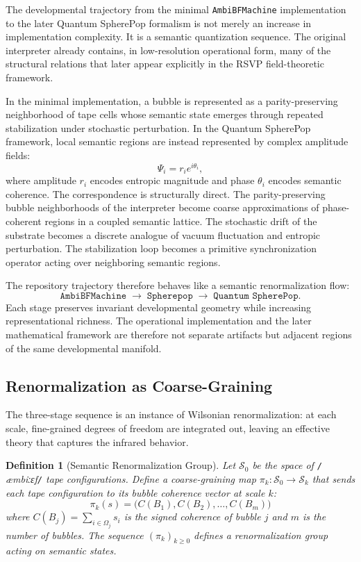 \documentclass[11pt]{article}
\newcommand{\ambibf}{%
  \texttt{/}\textnormal{æmbiːɛf}\texttt{/}%
}
\newtheorem{definition}[theorem]{Definition}
\begin{document}
The developmental trajectory from the minimal \texttt{AmbiBFMachine}
implementation to the later Quantum SpherePop formalism is not merely an
increase in implementation complexity. It is a semantic quantization sequence.
The original interpreter already contains, in low-resolution operational form,
many of the structural relations that later appear explicitly in the RSVP
field-theoretic framework.

In the minimal implementation, a bubble is represented as a parity-preserving
neighborhood of tape cells whose semantic state emerges through repeated
stabilization under stochastic perturbation. In the Quantum SpherePop
framework, local semantic regions are instead represented by complex amplitude
fields:
\[
\Psi_i = r_i e^{i\theta_i},
\]
where amplitude $r_i$ encodes entropic magnitude and phase $\theta_i$ encodes
semantic coherence. The correspondence is structurally direct. The
parity-preserving bubble neighborhoods of the interpreter become coarse
approximations of phase-coherent regions in a coupled semantic lattice. The
stochastic drift of the substrate becomes a discrete analogue of vacuum
fluctuation and entropic perturbation. The stabilization loop becomes a
primitive synchronization operator acting over neighboring semantic regions.

The repository trajectory therefore behaves like a semantic renormalization flow:
\[
\texttt{AmbiBFMachine}
\;\longrightarrow\;
\texttt{Spherepop}
\;\longrightarrow\;
\texttt{Quantum SpherePop}.
\]
Each stage preserves invariant developmental geometry while increasing
representational richness. The operational implementation and the later
mathematical framework are therefore not separate artifacts but adjacent regions
of the same developmental manifold.

\subsection*{Renormalization as Coarse-Graining}

The three-stage sequence is an instance of Wilsonian renormalization: at each
scale, fine-grained degrees of freedom are integrated out, leaving an effective
theory that captures the infrared behavior.

\begin{definition}[Semantic Renormalization Group]
Let $\mathcal{S}_0$ be the space of \ambibf{} tape configurations. Define a
coarse-graining map $\pi_k : \mathcal{S}_0 \to \mathcal{S}_k$ that sends each
tape configuration to its bubble coherence vector at scale $k$:
\[
\pi_k(s) = \bigl(C(B_1), C(B_2), \ldots, C(B_m)\bigr)
\]
where $C(B_j) = \sum_{i \in \Omega_j} s_i$ is the signed coherence of bubble
$j$ and $m$ is the number of bubbles. The sequence $(\pi_k)_{k \geq 0}$
defines a renormalization group acting on semantic states.
\end{definition}
\end{document}
